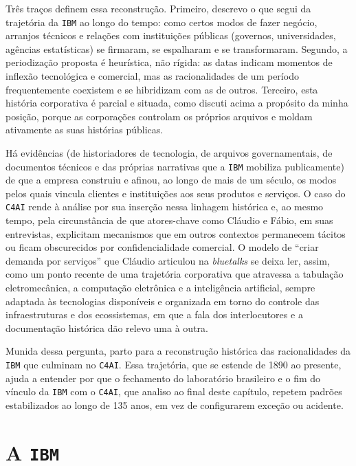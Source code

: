 Três traços definem essa reconstrução. Primeiro, descrevo o que segui da trajetória da \texttt{IBM} ao longo do tempo: como certos modos de fazer negócio, arranjos técnicos e relações com instituições públicas (governos, universidades, agências estatísticas) se firmaram, se espalharam e se transformaram. Segundo, a periodização proposta é heurística, não rígida: as datas indicam momentos de inflexão tecnológica e comercial, mas as racionalidades de um período frequentemente coexistem e se hibridizam com as de outros. Terceiro, esta história corporativa é parcial e situada, como discuti acima a propósito da minha posição, porque as corporações controlam os próprios arquivos e moldam ativamente as suas histórias públicas.

Há evidências (de historiadores de tecnologia, de arquivos governamentais, de documentos técnicos e das próprias narrativas que a \texttt{IBM} mobiliza publicamente) de que a empresa construiu e afinou, ao longo de mais de um século, os modos pelos quais vincula clientes e instituições aos seus produtos e serviços. O caso do \texttt{C4AI} rende à análise por sua inserção nessa linhagem histórica e, ao mesmo tempo, pela circunstância de que atores-chave como Cláudio e Fábio, em suas entrevistas, explicitam mecanismos que em outros contextos permanecem tácitos ou ficam obscurecidos por confidencialidade comercial. O modelo de \enquote{criar demanda por serviços} que Cláudio articulou na \textit{bluetalks} se deixa ler, assim, como um ponto recente de uma trajetória corporativa que atravessa a tabulação eletromecânica, a computação eletrônica e a inteligência artificial, sempre adaptada às tecnologias disponíveis e organizada em torno do controle das infraestruturas e dos ecossistemas, em que a fala dos interlocutores e a documentação histórica dão relevo uma à outra.

Munida dessa pergunta, parto para a reconstrução histórica das racionalidades da \texttt{IBM} que culminam no \texttt{C4AI}. Essa trajetória, que se estende de 1890 ao presente, ajuda a entender por que o fechamento do laboratório brasileiro e o fim do vínculo da \texttt{IBM} com o \texttt{C4AI}, que analiso ao final deste capítulo, repetem padrões estabilizados ao longo de 135 anos, em vez de configurarem exceção ou acidente.

\section{A \texttt{IBM}}
\label{sec:genealogia_ibm}

